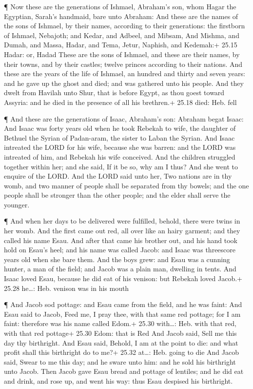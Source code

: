  ¶ Now these are the generations of Ishmael, Abraham's son,
whom Hagar the Egyptian, Sarah's handmaid, bare unto Abraham:
 And these are the names of the sons of Ishmael, by their
names, according to their generations: the firstborn of Ishmael,
Nebajoth; and Kedar, and Adbeel, and Mibsam,  And Mishma,
and Dumah, and Massa,  Hadar, and Tema, Jetur, Naphish, and
Kedemah:+ 25.15 Hadar: or, Hadad  These are the sons of
Ishmael, and these are their names, by their towns, and by their
castles; twelve princes according to their nations.  And
these are the years of the life of Ishmael, an hundred and thirty and
seven years: and he gave up the ghost and died; and was gathered unto
his people.  And they dwelt from Havilah unto Shur, that is
before Egypt, as thou goest toward Assyria: and he died in the presence
of all his brethren.+ 25.18 died: Heb. fell

 ¶ And these are the generations of Isaac, Abraham's son:
Abraham begat Isaac:  And Isaac was forty years old when he
took Rebekah to wife, the daughter of Bethuel the Syrian of Padan-aram,
the sister to Laban the Syrian.  And Isaac intreated the
LORD for his wife, because she was barren: and the LORD was intreated of
him, and Rebekah his wife conceived.  And the children
struggled together within her; and she said, If it be so, why am I thus?
And she went to enquire of the LORD.  And the LORD said
unto her, Two nations are in thy womb, and two manner of people shall be
separated from thy bowels; and the one people shall be stronger than the
other people; and the elder shall serve the younger.

 ¶ And when her days to be delivered were fulfilled,
behold, there were twins in her womb.  And the first came
out red, all over like an hairy garment; and they called his name Esau.
 And after that came his brother out, and his hand took
hold on Esau's heel; and his name was called Jacob: and Isaac was
threescore years old when she bare them.  And the boys
grew: and Esau was a cunning hunter, a man of the field; and Jacob was a
plain man, dwelling in tents.  And Isaac loved Esau,
because he did eat of his venison: but Rebekah loved Jacob.+ 25.28
he\ldots: Heb. venison was in his mouth

 ¶ And Jacob sod pottage: and Esau came from the field, and
he was faint:  And Esau said to Jacob, Feed me, I pray
thee, with that same red pottage; for I am faint: therefore was his name
called Edom.+ 25.30 with\ldots: Heb. with that red, with that red
pottage+ 25.30 Edom: that is Red  And Jacob said, Sell me
this day thy birthright.  And Esau said, Behold, I am at
the point to die: and what profit shall this birthright do to me?+ 25.32
at\ldots: Heb. going to die  And Jacob said, Swear to me
this day; and he sware unto him: and he sold his birthright unto Jacob.
 Then Jacob gave Esau bread and pottage of lentiles; and he
did eat and drink, and rose up, and went his way: thus Esau despised his
birthright.

